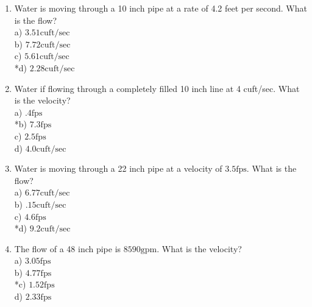 \documentclass{article}
\begin{document}
\begin{enumerate}

      \item Water is moving through a 10 inch pipe at a rate of 4.2 feet per second. What is the flow?\\
a) $3.51 \mathrm{cuft} / \mathrm{sec}$\\
b) $7.72 \mathrm{cuft} / \mathrm{sec}$\\
c) $5.61 \mathrm{cuft} / \mathrm{sec}$\\
*d) $2.28 \mathrm{cuft} / \mathrm{sec}$\\

      \item Water if flowing through a completely filled 10 inch line at 4 cuft/sec. What is the velocity?\\
a) $.4 \mathrm{fps}$\\
*b) $7.3 \mathrm{fps}$\\
c) $2.5 \mathrm{fps}$\\
d) $4.0 \mathrm{cuft} / \mathrm{sec}$\\

  \item Water is moving through a 22 inch pipe at a velocity of $3.5 \mathrm{fps}$. What is the flow?\\
a) $6.77 \mathrm{cuft} / \mathrm{sec}$\\
b) $.15 \mathrm{cuft} / \mathrm{sec}$\\
c) $4.6 \mathrm{fps}$\\
*d) $9.2 \mathrm{cuft} / \mathrm{sec}$\\

  \item The flow of a 48 inch pipe is $8590 \mathrm{gpm}$. What is the velocity?\\
a) $3.05 \mathrm{fps}$\\
b) $4.77 \mathrm{fps}$\\
*c) $1.52 \mathrm{fps}$\\
d) $2.33 \mathrm{fps}$\\


\end{enumerate}
\end{document}

